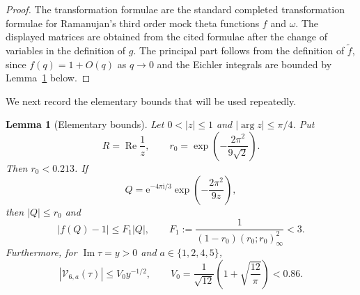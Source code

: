 \documentclass[10pt,a4paper]{amsart}
\newtheorem{lemma}[theorem]{Lemma}
\newcommand{\ii}{\mathrm i}
\newcommand{\e}{\mathrm e}
\newcommand{\Repart}{\operatorname{Re}}
\newcommand{\Impart}{\operatorname{Im}}
\begin{document}
\begin{proof}
The transformation formulae are the standard completed transformation formulae for
Ramanujan's third order mock theta functions $f$ and $\omega$.  The displayed
matrices are obtained from the cited formulae after the change of variables in the
definition of $g$.  The principal part follows from the definition of $\widetilde f$,
since $f(q)=1+O(q)$ as $q\to0$ and the Eichler integrals are bounded by
Lemma~\ref{lem:elementary-bounds} below.
\end{proof}

We next record the elementary bounds that will be used repeatedly.

\begin{lemma}[Elementary bounds]\label{lem:elementary-bounds}
Let $0<|z|\leq1$ and $|\arg z|\leq\pi/4$.  Put
\[
R=\Repart\frac1z,
\qquad
r_0=\exp\left(-\frac{2\pi^2}{9\sqrt2}\right).
\]
Then $r_0<0.213$.  If
\[
Q=\e^{-4\pi\ii/3}\exp\left(-\frac{2\pi^2}{9z}\right),
\]
then $|Q|\leq r_0$ and
\begin{equation}\label{eq:fQ-minus-one}
|f(Q)-1|
\leq F_1 |Q|,
\qquad
F_1:=\frac{1}{(1-r_0)(r_0;r_0)_\infty^2}<3.
\end{equation}
Furthermore, for $\Impart \tau=y>0$ and $a\in\{1,2,4,5\}$,
\begin{equation}\label{eq:eichler-bound}
|\mathcal V_{6,a}(\tau)|\leq V_0y^{-1/2},
\qquad
V_0=\frac1{\sqrt{12}}\left(1+\sqrt{\frac{12}{\pi}}\right)<0.86.
\end{equation}
\end{lemma}
\end{document}
